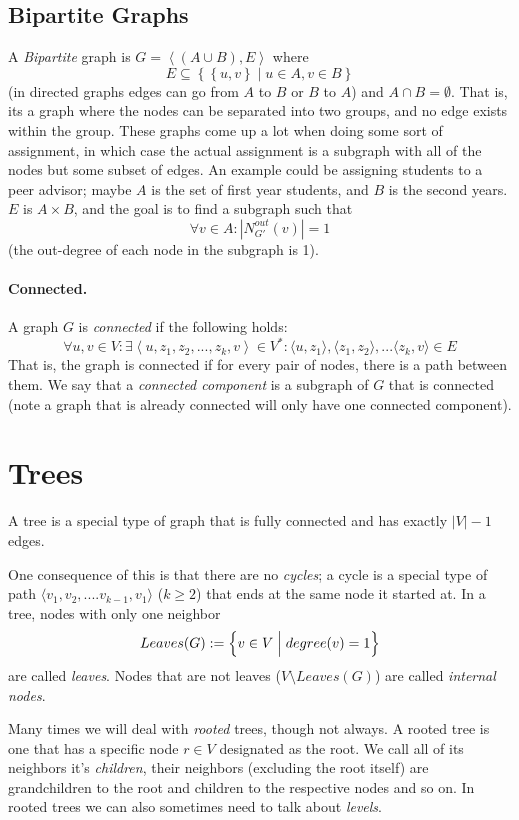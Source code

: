 \subsection{Bipartite Graphs}
A \emph{Bipartite} graph is $G=\left\langle \left(A\cup B\right), E \right\rangle$ 
where \[E\subseteq \left\{\left\{u,v\right\} \mid u\in A, v\in B\right\}\] (in directed graphs edges can go from $A$ to $B$ or $B$ to $A$)
and $A\cap B = \emptyset$. 
That is, its a graph where the nodes can be separated into two groups, and no edge exists within the group.  
These graphs come up a lot when doing some sort of assignment, in which case the actual assignment is a subgraph with all of the nodes but some subset of edges.
An example could be assigning students to a peer advisor; 
maybe $A$ is the set of first year students, and $B$ is the second years. 
$E$ is $A\times B$, and the goal is to find a subgraph such that 
\[\forall v \in A: |N^{out}_{G'}(v)|=1\]
(the out-degree of each node in the subgraph is 1).


\paragraph{Connected.} 
A graph $G$ is \emph{connected} if the following holds:
\[ \forall u,v \in V : \exists \left\langle u,z_1,z_2,...,z_k,v \right\rangle \in V^* : \langle u,z_1 \rangle, \langle z_1,z_2 \rangle, ... \langle z_k,v \rangle \in E  \]
That is, the graph is connected if for every pair of nodes, there is a path between them. 
We say that a \emph{connected component} is a subgraph of $G$ that is connected 
(note a graph that is already connected will only have one connected component). 


\section{Trees}
A tree is a special type of graph that is fully connected and has exactly $|V|-1$ edges. 

One consequence of this is that there are no \emph{cycles};
a cycle is a special type of path $\langle v_1, v_2,.... v_{k-1}, v_1\rangle$ ($k\ge 2$) that ends at the same node it started at. 
In a tree, nodes with only one neighbor \[Leaves(G) := \Bigl\{v \in V \;\Big|\; degree(v) =1\Bigr\}\] are called \emph{leaves}. 
Nodes that are not leaves ($V\setminus Leaves(G)$)  are called \emph{internal nodes}.

Many times we will deal with \emph{rooted} trees, though not always. 
A rooted tree is one that has a specific node $r\in V$ designated as the root. 
We call all of its neighbors it's \emph{children}, their neighbors (excluding the root itself) are grandchildren to the root and children to the respective nodes and so on. 
In rooted trees we can also sometimes need to talk about \emph{levels}. 

